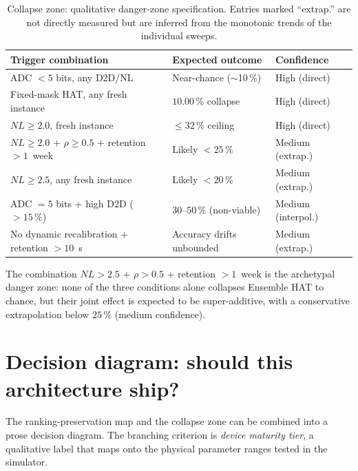 \begin{table}[t]
    \centering
    \caption{Collapse zone: qualitative danger-zone specification.  Entries marked ``extrap.'' are not directly measured but are inferred from the monotonic trends of the individual sweeps.}
    \label{tab:danger-zone}
    \small
    \begin{tabularx}{\textwidth}{@{}>{\raggedright\arraybackslash}X>{\raggedright\arraybackslash}X>{\raggedright\arraybackslash}p{}@{}}
        \toprule
        \textbf{Trigger combination} & \textbf{Expected outcome} & \textbf{Confidence} \\
        \midrule
        ADC $< 5$ bits, any D2D/NL & Near-chance ($\sim$10\,\%) & High (direct) \\
        Fixed-mask HAT, any fresh instance & $10.00\,\%$ collapse & High (direct) \\
        $NL \ge 2.0$, fresh instance & $\le 32\,\%$ ceiling & High (direct) \\
        $NL \ge 2.0$ + $\rho \ge 0.5$ + retention $>1$~week & Likely $< 25\,\%$ & Medium (extrap.) \\
        $NL \ge 2.5$, any fresh instance & Likely $< 20\,\%$ & Medium (extrap.) \\
        ADC $=5$ bits + high D2D ($>15\,\%$) & $30$--$50\,\%$ (non-viable) & Medium (interpol.) \\
        No dynamic recalibration + retention $>10$~s & Accuracy drifts unbounded & Medium (extrap.) \\
        \bottomrule
    \end{tabularx}
\end{table}

The combination $NL > 2.5$ + $\rho > 0.5$ + retention $> 1$~week is the archetypal danger zone: none of the three conditions alone collapses Ensemble HAT to chance, but their joint effect is expected to be super-additive, with a conservative extrapolation below $25\,\%$ (medium confidence).


\section{Decision diagram: should this architecture ship?}
\label{sec:decision-diagram}

The ranking-preservation map and the collapse zone can be combined into a prose decision diagram.  The branching criterion is \emph{device maturity tier}, a qualitative label that maps onto the physical parameter ranges tested in the simulator.

